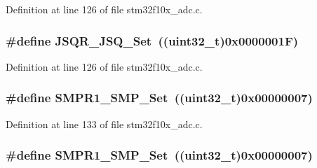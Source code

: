Definition at line 126 of file stm32f10x\+\_\+adc.\+c.

\subsubsection[{\texorpdfstring{J\+S\+Q\+R\+\_\+\+J\+S\+Q\+\_\+\+Set}{JSQR_JSQ_Set}}]{\setlength{\rightskip}{0pt plus 5cm}\#define J\+S\+Q\+R\+\_\+\+J\+S\+Q\+\_\+\+Set~(({\bf uint32\+\_\+t})0x0000001\+F)}\hypertarget{group___a_d_c___private___defines_ga5d460390dbe3b400b5e0fdf1e94929f0}{}\label{group___a_d_c___private___defines_ga5d460390dbe3b400b5e0fdf1e94929f0}


Definition at line 126 of file stm32f10x\+\_\+adc.\+c.

\subsubsection[{\texorpdfstring{S\+M\+P\+R1\+\_\+\+S\+M\+P\+\_\+\+Set}{SMPR1_SMP_Set}}]{\setlength{\rightskip}{0pt plus 5cm}\#define S\+M\+P\+R1\+\_\+\+S\+M\+P\+\_\+\+Set~(({\bf uint32\+\_\+t})0x00000007)}\hypertarget{group___a_d_c___private___defines_ga244048ec3ba9461a6609942def9a15ba}{}\label{group___a_d_c___private___defines_ga244048ec3ba9461a6609942def9a15ba}


Definition at line 133 of file stm32f10x\+\_\+adc.\+c.

\subsubsection[{\texorpdfstring{S\+M\+P\+R1\+\_\+\+S\+M\+P\+\_\+\+Set}{SMPR1_SMP_Set}}]{\setlength{\rightskip}{0pt plus 5cm}\#define S\+M\+P\+R1\+\_\+\+S\+M\+P\+\_\+\+Set~(({\bf uint32\+\_\+t})0x00000007)}\hypertarget{group___a_d_c___private___defines_ga244048ec3ba9461a6609942def9a15ba}{}\label{group___a_d_c___private___defines_ga244048ec3ba9461a6609942def9a15ba}


